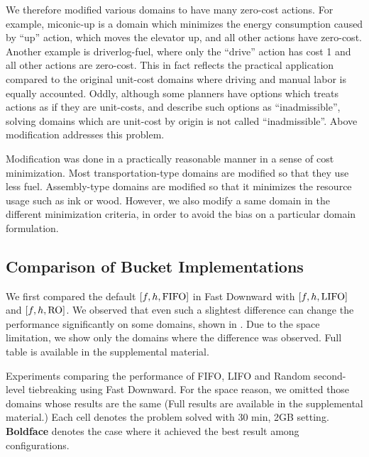 We therefore modified various domains to have many zero-cost actions.
For example, miconic-up is a domain which minimizes the energy
consumption caused by ``up'' action, which moves the elevator up, and
all other actions have zero-cost. Another example is driverlog-fuel, where only
the ``drive'' action has cost 1 and all other actions are zero-cost.
This in fact reflects the practical application compared to the original
unit-cost domains where driving and manual labor is equally accounted.
Oddly, although some planners have options which treats actions as if
they are unit-costs, and describe such options as ``inadmissible'',
solving domains which are unit-cost by origin is not called
``inadmissible''. Above modification addresses this problem.

Modification was done in a practically reasonable manner in a sense of
cost minimization. Most transportation-type domains are modified so that
they use less fuel. Assembly-type domains are modified so that it
minimizes the resource usage such as ink or wood. However, we also
modify a same domain in the different minimization criteria, in order to
avoid the bias on a particular domain formulation.


\subsection{Comparison of Bucket Implementations}

We first compared the default $[f,h,\mbox{FIFO}]$ in Fast Downward with
$[f,h,\mbox{LIFO}]$ and $[f,h,\mbox{RO}]$.  We observed that even such a slightest
difference can change the performance significantly on some domains,
shown in . Due to the space limitation, we show
only the domains where the difference was observed. Full table is
available in the supplemental material.

\begin{table}[htbp]
 \centering {} 
  \caption{Experiments
 comparing the performance of FIFO, LIFO and Random second-level
 tiebreaking using Fast Downward. For the space reason, we omitted those
 domains whose results are the same (Full results are available in the
 supplemental material.) Each cell denotes the problem solved with 30
 min, 2GB setting. \textbf{Boldface} denotes the case where it achieved
 the best result among configurations.}  \label{single-coverage}
\end{table}

